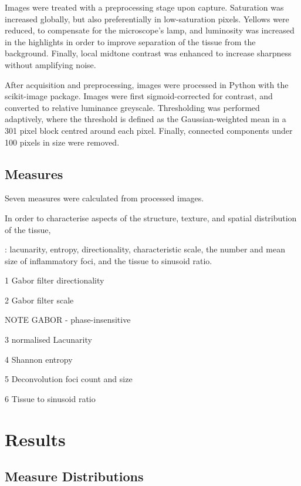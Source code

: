 \documentclass[10pt]{article}
\begin{document}
Images were treated with a preprocessing stage upon capture. Saturation was increased globally, but also preferentially in low-saturation pixels. Yellows were reduced, to compensate for the microscope's lamp, and luminosity was increased in the highlights in order to improve separation of the tissue from the background. Finally, local midtone contrast was enhanced to increase sharpness without amplifying noise.

After acquisition and preprocessing, images were processed in Python with the scikit-image package. Images were first sigmoid-corrected for contrast, and converted to relative luminance greyscale. Thresholding was performed adaptively, where the threshold is defined as the Gaussian-weighted mean in a 301 pixel block centred around each pixel. Finally, connected components under 100 pixels in size were removed.



\subsection*{Measures}

Seven measures were calculated from processed images.




 In order to characterise aspects of the structure, texture, and spatial distribution of the tissue, 

 : lacunarity, entropy, directionality, characteristic scale, the number and mean size of inflammatory foci, and the tissue to sinusoid ratio.



1 Gabor filter directionality

2 Gabor filter scale

NOTE GABOR - phase-insensitive

3 normalised Lacunarity

4 Shannon entropy

5 Deconvolution foci count and size

6 Tissue to sinusoid ratio





\section*{Results}

\subsection*{Measure Distributions}
\end{document}
